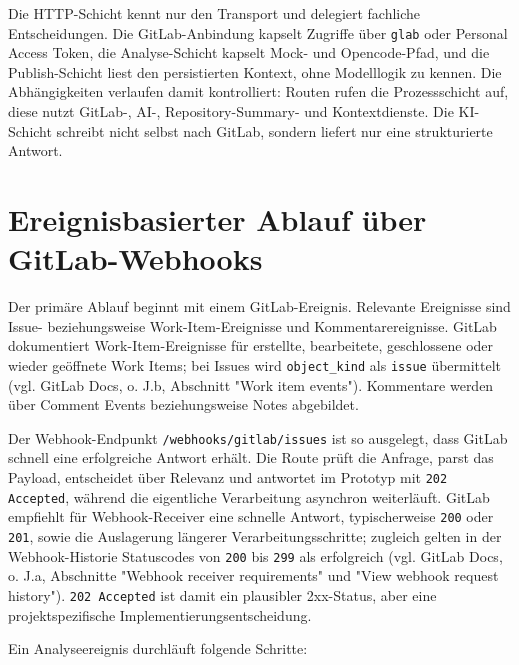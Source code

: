 \documentclass[12pt,a4paper,oneside]{scrreprt}
\begin{document}
Die HTTP-Schicht kennt nur den Transport und delegiert fachliche Entscheidungen. Die GitLab-Anbindung kapselt Zugriffe über \texttt{glab} oder Personal Access Token, die Analyse-Schicht kapselt Mock- und Opencode-Pfad, und die Publish-Schicht liest den persistierten Kontext, ohne Modelllogik zu kennen. Die Abhängigkeiten verlaufen damit kontrolliert: Routen rufen die Prozessschicht auf, diese nutzt GitLab-, AI-, Repository-Summary- und Kontextdienste. Die KI-Schicht schreibt nicht selbst nach GitLab, sondern liefert nur eine strukturierte Antwort.

\section{Ereignisbasierter Ablauf über GitLab-Webhooks}

Der primäre Ablauf beginnt mit einem GitLab-Ereignis. Relevante Ereignisse sind Issue- beziehungsweise Work-Item-Ereignisse und Kommentarereignisse. GitLab dokumentiert Work-Item-Ereignisse für erstellte, bearbeitete, geschlossene oder wieder geöffnete Work Items; bei Issues wird \texttt{object\_kind} als \texttt{issue} übermittelt (vgl. GitLab Docs, o. J.b, Abschnitt "Work item events"). Kommentare werden über Comment Events beziehungsweise Notes abgebildet.

Der Webhook-Endpunkt \texttt{/webhooks/gitlab/issues} ist so ausgelegt, dass GitLab schnell eine erfolgreiche Antwort erhält. Die Route prüft die Anfrage, parst das Payload, entscheidet über Relevanz und antwortet im Prototyp mit \texttt{202 Accepted}, während die eigentliche Verarbeitung asynchron weiterläuft. GitLab empfiehlt für Webhook-Receiver eine schnelle Antwort, typischerweise \texttt{200} oder \texttt{201}, sowie die Auslagerung längerer Verarbeitungsschritte; zugleich gelten in der Webhook-Historie Statuscodes von \texttt{200} bis \texttt{299} als erfolgreich (vgl. GitLab Docs, o. J.a, Abschnitte "Webhook receiver requirements" und "View webhook request history"). \texttt{202 Accepted} ist damit ein plausibler 2xx-Status, aber eine projektspezifische Implementierungsentscheidung.

Ein Analyseereignis durchläuft folgende Schritte:
\end{document}

